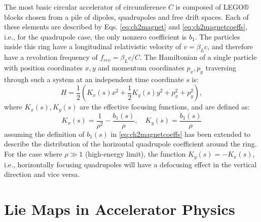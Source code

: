 The most basic circular accelerator of circumference $C$ is composed of LEGO® blocks chosen from a pile of dipoles, quadrupoles and free drift spaces. Each of these elements are described by Eqs. \ref{eq:ch2magnet} and \ref{eq:ch2magnetcoeffs}, i.e., for the quadrupole case, the only nonzero coefficient is $b_1$. The particles inside this ring have a longitudinal relativistic velocity of $v=\beta_L c$, and therefore have a revolution frequency of $f_{rev}=\beta_L c/C$. The Hamiltonian of a single particle with position coordinates $x,y$ and momentum coordinates $p_x,p_y$ traversing through such a system at an independent time coordinate $s$ is:
\begin{equation}
    \label{eq:ham1}
    H=\frac{1}{2}\left( K_x(s)x^2+ \frac{1}{2}K_y(s)y^2+ p_x^2 + p_y^2\right),
\end{equation}
where $K_x(s),K_y(s)$ are the effective focusing functions, and are defined as:
\begin{equation}
    \label{eq:kx}
    K_x(s)=\frac{1}{\rho^2}-\frac{b_1(s)}{\rho}, \quad K_y(s)=\frac{b_1(s)}{\rho}
\end{equation}
assuming the definition of $b_1(s)$ in \ref{eq:ch2magnetcoeffs} has been extended to describe the distribution of the horizontal quadrupole coefficient around the ring. For the case where $\rho\gg 1$ (high-energy limit), the function $K_y(s)=-K_x(s)$, i.e., horizontally focusing quadrupoles will have a defocusing effect in the vertical direction and vice versa. 

\section{\label{sec:lie}Lie Maps in Accelerator Physics}

